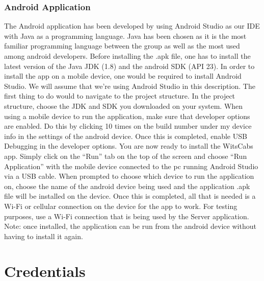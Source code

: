 \documentclass[a4paper,12pt]{article}
\begin{document}
\subsubsection{Android Application}
The Android application has been developed by using Android Studio as our IDE with Java as a programming language. Java has been chosen as it is the most familiar programming language between the group as well as the most used among android developers. Before installing the .apk file, one has to install the latest version of the Java JDK (1.8) and the android SDK (API 23). In order to install the app on a mobile device,  one would be required to install Android Studio. We will assume that we're using Android Studio in this description. The first thing to do would to navigate to the project structure. In the project structure, choose the JDK and SDK you downloaded on your system. 
When using a mobile device to run the application, make sure that developer options are enabled. Do this by clicking 10 times on the build number under my device info in the settings of the android device. Once this is completed, enable USB Debugging in the developer options. You are now ready to install the WitsCabs app. Simply click on the ``Run'' tab on the top of the screen and choose ``Run Application'' with the mobile device connected to the pc running Android Studio via a USB cable. When prompted to choose which device to run the application on, choose the name of the android device being used and the application .apk file will be installed on the device. Once this is completed, all that is needed is a Wi-Fi or cellular connection on the device for the app to work. For testing purposes, use a Wi-Fi connection that is being used by the Server application. Note: once installed, the application can be run from the android device without having to install it again.



\pagebreak
\section{Credentials}
\end{document}
